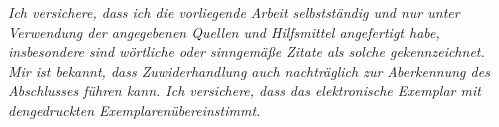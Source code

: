 \vspace*{\fill}
\noindent

\textit{Ich versichere, dass ich die vorliegende Arbeit selbstständig und nur unter Verwendung der angegebenen Quellen und Hilfsmittel angefertigt habe, insbesondere sind wörtliche oder sinngemäße Zitate als solche gekennzeichnet. Mir ist bekannt, dass Zuwiderhandlung auch nachträglich zur Aberkennung des Abschlusses führen kann. Ich versichere, dass das elektronische Exemplar mit dengedruckten Exemplarenübereinstimmt.}


\vspace*{\fill}
